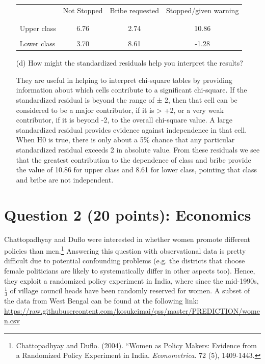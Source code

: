 \documentclass[12pt,letterpaper]{article}
\begin{document}
\begin{enumerate}
	\begin{table}[h]
		\centering
		\begin{tabular}{l | c c c }
			& Not Stopped & Bribe requested & Stopped/given warning \\
			\\[-1.8ex] 
			\hline \\[-1.8ex]
			Upper class  & 6.76 & 2.74 & 10.86 \\
			\\
			Lower class & 3.70 & 8.61  & -1.28  \\
			
		\end{tabular}
	\end{table}
	
	
	\vspace{7cm}
	\item [(d)] How might the standardized residuals help you interpret the results?  
	
	They are useful in helping to interpret chi-square tables by providing information about which cells contribute to a significant chi-square. If the standardized residual is beyond the range of ± 2, then that cell can be considered to be a major contributor, if it is > +2, or a very weak contributor, if it is beyond -2, to the overall chi-square value.
	A large standardized residual provides evidence against independence in that cell. When H0 is true, there is only about a 5\% chance that any particular standardized residual exceeds 2 in absolute value. From these residuals we see that the greatest contribution to the dependence of class and bribe provide the value of 10.86 for upper class and 8.61 for lower class, pointing that class and bribe are not independent.  
	
\end{enumerate}
\newpage

\section*{Question 2 (20 points): Economics}
Chattopadhyay and Duflo were interested in whether women promote different policies than men.\footnote{Chattopadhyay and Duflo. (2004). ``Women as Policy Makers: Evidence from a Randomized Policy Experiment in India. \textit{Econometrica}. 72 (5), 1409-1443.} Answering this question with observational data is pretty difficult due to potential confounding problems (e.g. the districts that choose female politicians are likely to systematically differ in other aspects too). Hence, they exploit a randomized policy experiment in India, where since the mid-1990s, $\frac{1}{3}$ of village council heads have been randomly reserved for women. A subset of the data from West Bengal can be found at the following link: \url{https://raw.githubusercontent.com/kosukeimai/qss/master/PREDICTION/women.csv}\\
\end{document}

